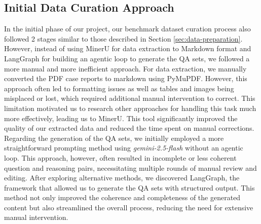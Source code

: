 \subsection{Initial Data Curation Approach}
\label{sec:data-curation-initial}

In the initial phase of our project, our benchmark dataset curation process also followed 2 stages similar to those described in Section \ref{sec:data-preparation}. However, instead of using MinerU for data extraction to Markdown format and LangGraph for building an agentic loop to generate the QA sets, we followed a more manual and more inefficient approach. 
For data extraction, we manually converted the PDF case reports to markdown using PyMuPDF. However, this approach often led to formatting issues as well as tables and images being misplaced or lost, which required additional manual intervention to correct. 
This limitation motivated us to research other approaches for handling this task much more effectively, leading us to MinerU. This tool significantly improved the quality of our extracted data and reduced the time spent on manual corrections. Regarding the generation of the QA sets, we initially employed a more straightforward prompting method using \textit{gemini-2.5-flash} without an agentic loop. This approach, however, often resulted in incomplete or less coherent question and reasoning pairs, necessitating multiple rounds of manual review and editing. 
After exploring alternative methods, we discovered LangGraph, the framework that allowed us to generate the QA sets with structured output. This method not only improved the coherence and completeness of the generated content but also streamlined the overall process, reducing the need for extensive manual intervention.
